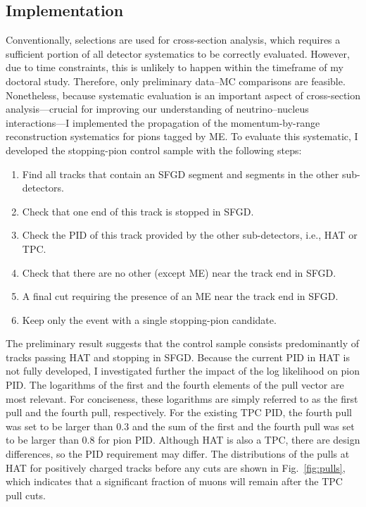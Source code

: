           \subsection{Implementation}
          \label{sec:sppi-imp}
          Conventionally, selections are used for cross-section analysis, which requires a sufficient portion of all detector systematics to be correctly evaluated.
          However, due to time constraints, this is unlikely to happen within the timeframe of my doctoral study.
          Therefore, only preliminary data–MC comparisons are feasible.
          Nonetheless, because systematic evaluation is an important aspect of cross-section analysis—crucial for improving our understanding of neutrino–nucleus interactions—I implemented the propagation of the momentum-by-range reconstruction systematics for pions tagged by ME.
          To evaluate this systematic, I developed the stopping-pion control sample with the following steps:
          \begin{enumerate}
          \item Find all tracks that contain an SFGD segment and segments in the other sub-detectors.
          \item Check that one end of this track is stopped in SFGD.
          \item Check the PID of this track provided by the other sub-detectors, i.e., HAT or TPC.
          \item Check that there are no other (except ME) near the track end in SFGD.
          \item A final cut requiring the presence of an ME near the track end in SFGD.
          \item Keep only the event with a single stopping-pion candidate.
          \end{enumerate}
          The preliminary result suggests that the control sample consists predominantly of tracks passing HAT and stopping in SFGD.
          Because the current PID in HAT is not fully developed, I investigated further the impact of the log likelihood on pion PID.
          The logarithms of the first and the fourth elements of the pull vector are most relevant.
          For conciseness, these logarithms are simply referred to as the first pull and the fourth pull, respectively.
          For the existing TPC PID, the fourth pull was set to be larger than $0.3$ and the sum of the first and the fourth pull was set to be larger than $0.8$ for pion PID.
          Although HAT is also a TPC, there are design differences, so the PID requirement may differ.
          The distributions of the pulls at HAT for positively charged tracks before any cuts are shown in Fig.~\ref{fig:pulls}, which indicates that a significant fraction of muons will remain after the TPC pull cuts.


